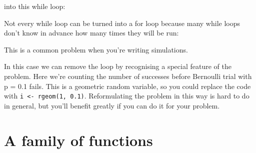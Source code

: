 \begin{Shaded}
\begin{Highlighting}[]
 \OperatorTok{:}\NormalTok{) }
\end{Highlighting}
\end{Shaded}

into this while loop:

\begin{Shaded}
\begin{Highlighting}[]
\StringTok{ }
\OperatorTok{<=}\StringTok{ }\NormalTok{) \{}
\StringTok{ }\OperatorTok{+}\StringTok{ }
\NormalTok{\}}
\end{Highlighting}
\end{Shaded}

Not every while loop can be turned into a for loop because many while
loops don't know in advance how many times they will be run:

\begin{Shaded}
\begin{Highlighting}[]
\StringTok{ }
\NormalTok{(}\NormalTok{) \{}
  \NormalTok{ (}\NormalTok{(}\NormalTok{) }\OperatorTok{>}\StringTok{ }\NormalTok{) }
\StringTok{ }\OperatorTok{+}\StringTok{ }
\NormalTok{\}}
\end{Highlighting}
\end{Shaded}

This is a common problem when you're writing simulations.

In this case we can remove the loop by recognising a special feature of
the problem. Here we're counting the number of successes before
Bernoulli trial with p = 0.1 fails. This is a geometric random variable,
so you could replace the code with
\texttt{i\ \textless{}-\ rgeom(1,\ 0.1)}. Reformulating the problem in
this way is hard to do in general, but you'll benefit greatly if you can
do it for your problem.

\hypertarget{function-family}{%
\section{A family of functions}\label{function-family}}

